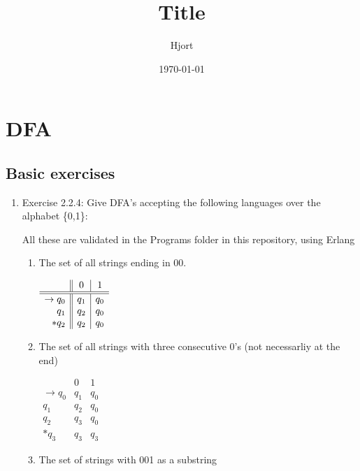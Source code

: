 \documentclass{article}
\title{Title}
\date{\today}
\author{Hjort}
\begin{document}
\maketitle

\section*{DFA}
\subsection*{Basic exercises}

\begin{enumerate}
    \item {Exercise 2.2.4:} Give DFA's accepting the following languages over the alphabet \{0,1\}:

        All these are validated in the Programs folder in this repository, using Erlang

        \begin{enumerate}
            \item The set of all strings ending in $00$.

                $
                \begin{array}{r || c | c}
                        & 0 & 1 \\ \hline \hline
                    \to q_0 & q_1 & q_0 \\
                        q_1 & q_2 & q_0\\
                        *q_2 & q_2 & q_0
                \end{array}
                $

            \item The set of all strings with three consecutive 0's (not necessarliy at the end)

                $ \begin{array}{r||c|c}
                            & 0 & 1 \\ \hline \hline
                    \to q_0 & q_1 & q_0 \\
                    q_1 & q_2 & q_0 \\
                    q_2 & q_3 & q_0 \\
                    *q_3 & q_3 & q_3
                \end{array}
                $

            \item The set of strings with 001 as a substring


\end{enumerate}
\end{enumerate}
\end{document}
